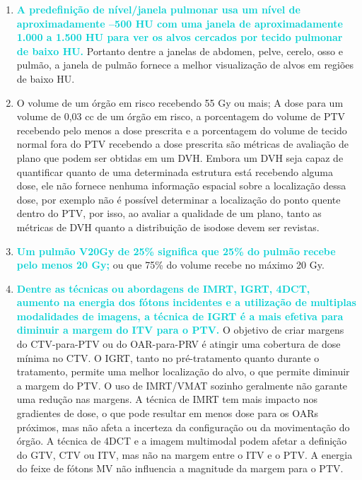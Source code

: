 \documentclass[11pt,a4paper]{article}
\newcounter{exemplo}
\begin{document}
\begin{enumerate}
        \begin{center}
        \end{center}

        \item \textcolor{DarkTurquoise}{\textbf{A predefinição de nível/janela pulmonar usa um nível de aproximadamente –500 HU com uma janela de aproximadamente 1.000 a 1.500 HU para ver os alvos cercados por tecido pulmonar de baixo HU.}} Portanto dentre a janelas de abdomen, pelve, cerelo, osso e pulmão, a janela de pulmão fornece a melhor visualização de alvos em regiões de baixo HU.

        \item O volume de um órgão em risco recebendo 55 Gy ou mais; A dose para um volume de 0,03 cc de um órgão em risco, a porcentagem do volume de PTV recebendo pelo menos a dose prescrita e a  porcentagem do volume de tecido normal fora do PTV recebendo a dose prescrita são métricas de avaliação de plano que podem ser obtidas em um DVH. Embora um DVH seja capaz de quantificar quanto de uma determinada estrutura está recebendo alguma dose, ele não fornece nenhuma informação espacial sobre a localização dessa dose, por exemplo não é possível determinar a localização do ponto quente dentro do PTV, por isso, ao avaliar a qualidade de um plano, tanto as métricas de DVH quanto a distribuição de isodose devem ser revistas.

        \item \textcolor{DarkTurquoise}{\textbf{Um pulmão V20Gy de 25\% significa que 25\% do pulmão recebe pelo menos 20 Gy;}} ou que 75\% do volume recebe no máximo 20 Gy.

        \item \textcolor{DarkTurquoise}{\textbf{Dentre as técnicas ou abordagens de IMRT, IGRT, 4DCT, aumento na energia dos fótons incidentes e a utilização de multiplas modalidades de imagens, a técnica de IGRT é a mais efetiva para diminuir a margem do ITV para o PTV.}} O objetivo de criar margens do CTV-para-PTV ou do OAR-para-PRV é atingir uma cobertura de dose mínima no CTV. O IGRT, tanto no pré-tratamento quanto durante o tratamento, permite uma melhor localização do alvo, o que permite diminuir a margem do PTV. O uso de IMRT/VMAT sozinho geralmente não garante uma redução nas margens. A técnica de IMRT tem mais impacto nos gradientes de dose, o que pode resultar em menos dose para os OARs próximos, mas não afeta a incerteza da configuração ou da movimentação do órgão. A técnica de 4DCT e a imagem multimodal podem afetar a definição do GTV, CTV ou ITV, mas não na margem entre o ITV e o PTV. A energia do feixe de fótons MV não influencia a magnitude da margem para o PTV.


\end{enumerate}
\end{document}

